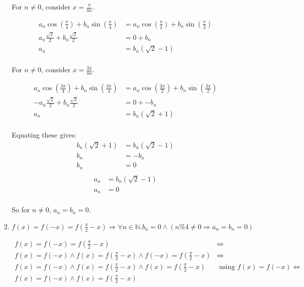 \documentclass[10pt,\jkfside,a4paper]{article}
\begin{document}
\begin{enumerate}
\begin{enumerate}
For $n \neq 0$, consider $x = \frac{\pi}{4n}$.

\[
\begin{split}
a_n\cos\left(\frac{\pi}{4}\right) + b_n\sin\left(\frac{\pi}{4}\right) &= a_n\cos\left(\frac{\pi}{2}\right) + b_n\sin\left(\frac{\pi}{2}\right) \\
a_n\frac{\sqrt{2}}{2} + b_n\frac{\sqrt{2}}{2} &= 0 + b_n \\
a_n &= b_n(\sqrt{2} - 1) \\
\end{split}
\]

For $n \neq 0$, consider $x = \frac{3\pi}{4n}$.

\[
\begin{split}
a_n\cos\left(\frac{3\pi}{4}\right) + b_n\sin\left(\frac{3\pi}{4}\right) &= a_n\cos\left(\frac{3\pi}{2}\right) + b_n\sin\left(\frac{3\pi}{2}\right) \\
-a_n\frac{\sqrt{2}}{2} + b_n\frac{\sqrt{2}}{2} &= 0 + -b_n \\
a_n &= b_n(\sqrt{2} + 1) \\
\end{split}
\]

Equating these gives:
\[
\begin{split}
b_n(\sqrt{2} + 1) &= b_n(\sqrt{2} - 1) \\
b_n &= -b_n \\
b_n &= 0 \\
\end{split}
\]
\[
\begin{split}
a_n &= b_n(\sqrt{2} - 1) \\
a_n &= 0 \\
\end{split}
\]

So for $n \neq 0$, $a_n = b_n = 0$.

\item $f(x) = f(-x) = f\left(\frac{\pi}{2} - x\right) \Longrightarrow \forall n \in \mathbb{N}. b_n = 0 \wedge (n \% 4 \neq 0 \Longrightarrow a_n = b_n = 0)$

\[
\begin{split}
f(x) = f(-x) = f\left(\frac{\pi}{2} - x\right) &\Longleftrightarrow \\
f(x) = f(-x) \wedge f(x) = f\left(\frac{\pi}{2} - x\right) \wedge f(-x) = f\left(\frac{\pi}{2} - x\right) &\Longleftrightarrow \\
f(x) = f(-x) \wedge f(x) = f\left(\frac{\pi}{2} - x\right) \wedge f(x) = f\left(\frac{\pi}{2} - x\right) & \text{ using } f(x) = f(-x) \Longleftrightarrow \\
f(x) = f(-x) \wedge f(x) = f\left(\frac{\pi}{2} - x\right)& \\
\end{split}
\]


\end{enumerate}
\end{enumerate}
\end{document}
